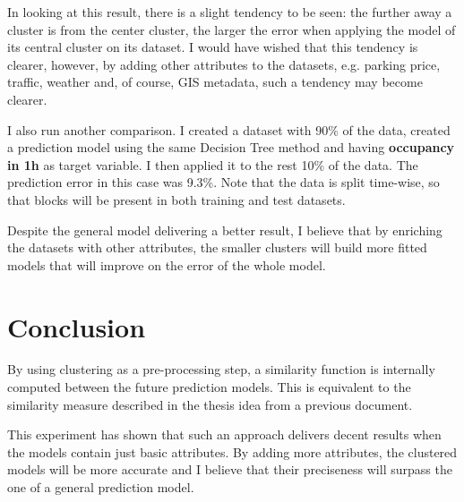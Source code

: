 \documentclass{article}
\begin{document}
In looking at this result, there is a slight tendency to be seen: the further away a cluster is from the center cluster, the larger the error when applying the model of its central cluster on its dataset. I would have wished that this tendency is clearer, however, by adding other attributes to the datasets, e.g. parking price, traffic, weather and, of course, GIS metadata, such a tendency may become clearer.
\vspace{2mm}

I also run another comparison. I created a dataset with 90\% of the data, created a prediction model using the same Decision Tree method and having \textbf{occupancy in 1h} as target variable. I then applied it to the rest 10\% of the data. The prediction error in this case was 9.3\%. Note that the data is split time-wise, so that blocks will be present in both training and test datasets. 
\vspace{2mm}

Despite the general model delivering a better result, I believe that by enriching the datasets with other attributes, the smaller clusters will build more fitted models that will improve on the error of the whole model.

\section{Conclusion}
\label{sec:Conclusion}

By using clustering as a pre-processing step, a similarity function is internally computed between the future prediction models. This is equivalent to the similarity measure described in the thesis idea from a previous document.

This experiment has shown that such an approach delivers decent results when the models contain just basic attributes. By adding more attributes, the clustered models will be more accurate and I believe that their preciseness will surpass the one of a general prediction model.

\nocite{*}

\printbibliography
\end{document}
